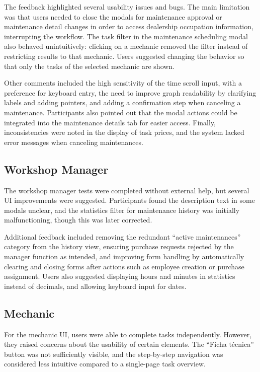 The feedback highlighted several usability issues and bugs. The main limitation was that users needed to close the modals for maintenance approval or maintenance detail changes in order to access dealership occupation information, interrupting the workflow. The task filter in the maintenance scheduling modal also behaved unintuitively: clicking on a mechanic removed the filter instead of restricting results to that mechanic. Users suggested changing the behavior so that only the tasks of the selected mechanic are shown.

Other comments included the high sensitivity of the time scroll input, with a preference for keyboard entry, the need to improve graph readability by clarifying labels and adding pointers, and adding a confirmation step when canceling a maintenance. Participants also pointed out that the modal actions could be integrated into the maintenance details tab for easier access. Finally, inconsistencies were noted in the display of task prices, and the system lacked error messages when canceling maintenances.

\subsection{Workshop Manager}

The workshop manager tests were completed without external help, but several \ac{UI} improvements were suggested. Participants found the description text in some modals unclear, and the statistics filter for maintenance history was initially malfunctioning, though this was later corrected.

Additional feedback included removing the redundant “active maintenances” category from the history view, ensuring purchase requests rejected by the manager function as intended, and improving form handling by automatically clearing and closing forms after actions such as employee creation or purchase assignment. Users also suggested displaying hours and minutes in statistics instead of decimals, and allowing keyboard input for dates.

\subsection{Mechanic}

For the mechanic \ac{UI}, users were able to complete tasks independently. However, they raised concerns about the usability of certain elements. The “Ficha técnica” button was not sufficiently visible, and the step-by-step navigation was considered less intuitive compared to a single-page task overview.

